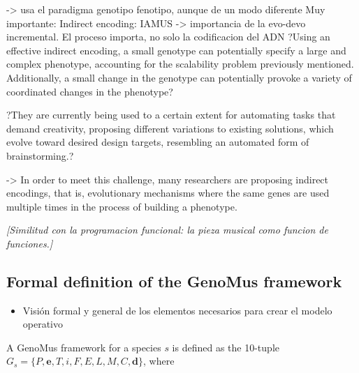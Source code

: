 \documentclass{article}
\renewcommand{\vec}[1]{\mathbf{#1}}
\begin{document}
{\color{red}




 -> usa el paradigma genotipo fenotipo, aunque de un modo diferente
Muy importante: Indirect encoding: IAMUS -> importancia de la evo-devo incremental. El proceso importa, no solo la codificacion del ADN
?Using an effective indirect encoding, a small
genotype can potentially specify a large and complex
phenotype, accounting for the scalability problem
previously mentioned. Additionally, a small change
in the genotype can potentially provoke a variety of
coordinated changes in the phenotype?

?They are currently
being used to a certain extent for automating
tasks that demand creativity, proposing different
variations to existing solutions, which evolve toward
desired design targets, resembling an automated form
of brainstorming.?


\cite{stanley:alife03} -> In order to meet this
challenge, many researchers are proposing indirect
encodings, that is, evolutionary mechanisms where the same
genes are used multiple times in the process of building a
phenotype.

}




{\color{gray} \textsl{[Similitud con la programacion funcional: la pieza musical como funcion de funciones.]}}



\subsection{Formal definition of the GenoMus framework}\label{sec:formaldef}

{\color{gray}
\begin{itemize}
\item Visión formal y general de los elementos necesarios para crear el modelo  operativo
\end{itemize}
}

A GenoMus framework for a species $s$ is defined as the 10-tuple $G_s = \{P, \vec{e}, T, i, F, E, L, M, C, \vec{d}\}$, where
\end{document}
